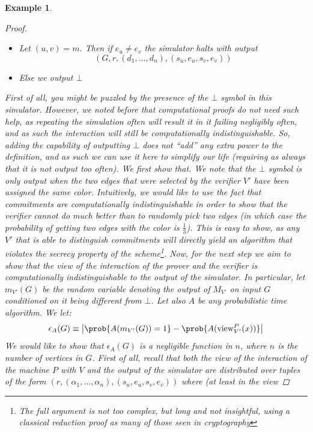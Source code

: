 \documentclass{article}
\newtheorem{example}{Example}
\begin{document}
\begin{example}
\begin{proof}
\begin{itemize}
            \item Let $(u, v) = m$. Then if $e_u \neq e_v$ the simulator halts with output \[(G, r, (d_1, \dots, d_n), (s_u, e_u, s_v, e_v))\]
            \item Else we output $\bot$
        \end{itemize}
        First of all, you might be puzzled by the presence of the $\bot$ symbol in this simulator.
        However, we noted before that computational proofs do not need such help, as repeating the simulation often
        will result it in it failing negligibly often, and as such the interaction will still be computationally indistinguishable.
        So, adding the capability of outputting $\bot$ does not \enquote{add} any extra power to the definition, and as such we
        can use it here to simplify our life (requiring as always that it is not output too often).
        We first show that. We note that the $\bot$ symbol is only output when
        the two edges that were selected by the verifier $V'$ have been assigned the same color.
        Intuitively, we would like to use the fact that commitments are computationally indistinguishable
        in order to show that the verifier cannot do much better than to randomly pick two edges (in which
        case the probability of getting two edges with the color is $\frac{1}{3}$). This is easy to show,
        as any $V'$ that is able to distinguish commitments will directly yield an algorithm that violates
        the secrecy property of the scheme\footnote{The full argument is not too complex, but long and not
            insightful, using a classical reduction proof as many of those seen in cryptography}.
        Now, for the next step we aim to show that the view of the interaction of the prover and the verifier is
        computationally indistinguishable to the output of the simulator. In particular, let $m_{V'}(G)$ be the
        random variable denoting the output of $M_{V'}$ on input $G$ conditioned on it being different from $\bot$.
        Let also $A$ be any probabilistic time algorithm.
        We let:
        \[ \epsilon_A(G) \equiv \left| \prob{A(m_{V'}(G)) = 1} - \prob{A(\text{view}^{P}_{V'}(x))} \right| \]
        We would like to show that $\epsilon_A(G)$ is a negligible function in $n$, where $n$ is the number
        of vertices in $G$. First of all, recall that both the view of the interaction of the machine $P$ with $V$
        and the output of the simulator are distributed over tuples of the form $(r, (\alpha_1, \dots , \alpha_n), (s_u, e_u, s_v, e_v))$ where (at least in the view

\end{proof}
\end{example}
\end{document}
